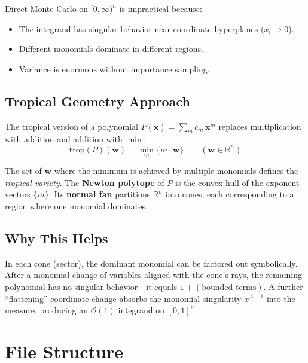 \documentclass[11pt,a4paper]{article}
\begin{document}
Direct Monte Carlo on $[0,\infty)^n$ is impractical because:
\begin{itemize}
  \item The integrand has singular behavior near coordinate hyperplanes ($x_i \to 0$).
  \item Different monomials dominate in different regions.
  \item Variance is enormous without importance sampling.
\end{itemize}

\subsection{Tropical Geometry Approach}

The tropical version of a polynomial $P(\mathbf{x}) = \sum_m c_m \, \mathbf{x}^m$ replaces multiplication with addition and addition with $\min$:
\begin{equation}
\mathrm{trop}(P)(\mathbf{w}) = \min_m \{ m \cdot \mathbf{w} \} \qquad (\mathbf{w} \in \mathbb{R}^n)
\end{equation}

The set of $\mathbf{w}$ where the minimum is achieved by multiple monomials defines the \textit{tropical variety}. The \textbf{Newton polytope} of $P$ is the convex hull of the exponent vectors $\{m\}$. Its \textbf{normal fan} partitions $\mathbb{R}^n$ into cones, each corresponding to a region where one monomial dominates.

\subsection{Why This Helps}

In each cone (sector), the dominant monomial can be factored out symbolically. After a monomial change of variables aligned with the cone's rays, the remaining polynomial has no singular behavior---it equals $1 + (\text{bounded terms})$. A further ``flattening'' coordinate change absorbs the monomial singularity $x^{A-1}$ into the measure, producing an $\mathcal{O}(1)$ integrand on $[0,1]^n$.

\section{File Structure}
\end{document}
